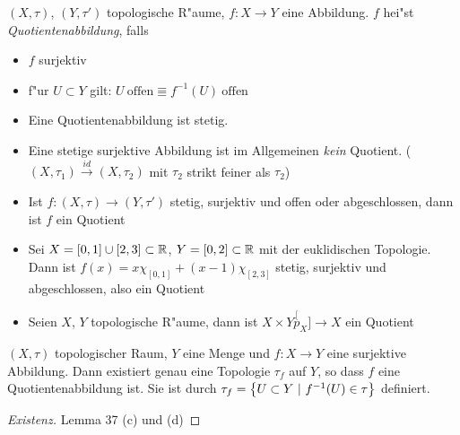 \begin{dfn}
    $(X,\tau)$, $(Y, \tau')$ topologische R"aume, $f: X\to Y$ eine Abbildung.
    $f$ hei"st \emph{Quotientenabbildung}, falls
    \begin{itemize}
        \item $f$ surjektiv
        \item f"ur $U \subset Y$ gilt: $U\ \text{offen} \Equiv f^{-1}(U)\
            \mathrm{offen}$
    \end{itemize}

    \begin{bem}
        \begin{itemize}
            \item Eine Quotientenabbildung ist stetig.
            \item Eine stetige surjektive Abbildung ist im Allgemeinen
                \emph{kein} Quotient. ($(X, \tau_1) \overset{id} \to
                (X,\tau_2)$ mit $\tau_2$ strikt feiner als $\tau_2$)
        \end{itemize}
    \end{bem}

    \begin{bsps}
        \begin{itemize}
            \item Ist $f:(X,\tau)\to (Y,\tau')$ stetig, surjektiv und offen
                oder abgeschlossen, dann ist $f$ ein Quotient
            \item Sei $X=[0,1]\cup [2,3] \subset \mathbb{R}$, $Y=[0,2]\subset \mathbb{R}$ mit
                der euklidischen Topologie. Dann ist $f(x)=x\chi_{[0,1]} +
                (x-1)\chi_{[2,3]}$ stetig, surjektiv und abgeschlossen, also
                ein Quotient
            \item Seien $X$, $Y$ topologische R"aume, dann ist $X\times Y
                \overset[p_X]{\to} X$ ein Quotient
        \end{itemize}
    \end{bsps}
\end{dfn}

\begin{dfn}
    $(X,\tau)$ topologischer Raum, $Y$ eine Menge und $f:X\to Y$ eine
    surjektive Abbildung. Dann existiert genau eine Topologie $\tau_f$ auf $Y$,
    so dass $f$ eine Quotientenabbildung ist. Sie ist durch $\tau_f =
    \mdef[U\subset Y]{f^{-1}(U)\in \tau}$ definiert.
    \begin{proof}[Existenz]
        Lemma 37 (c) und (d)
    \end{proof}
\end{dfn}

